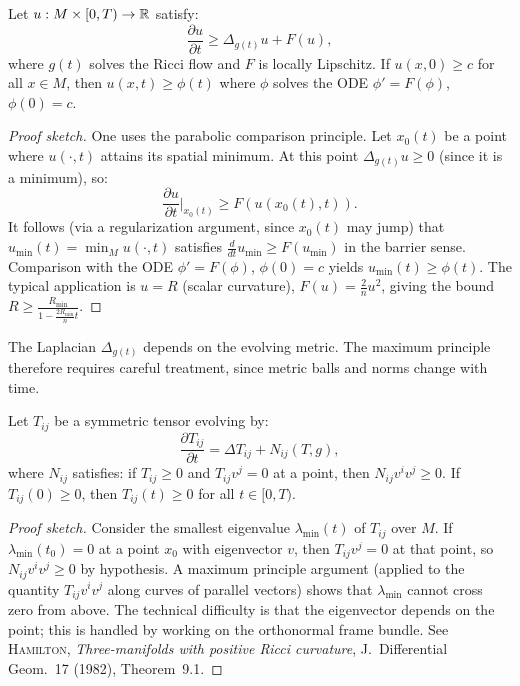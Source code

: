 \begin{theorem}
\label{thm:scalar_maximum}
Let $u : M \times [0, T) \to \mathbb{R}$ satisfy:
\[
    \frac{\partial u}{\partial t} \geq \Delta_{g(t)} u + F(u),
\]
where $g(t)$ solves the Ricci flow and $F$ is locally Lipschitz. If
$u(x, 0) \geq c$ for all $x \in M$, then $u(x, t) \geq \phi(t)$ where $\phi$
solves the ODE $\phi' = F(\phi)$, $\phi(0) = c$.
\end{theorem}

\begin{proof}[Proof sketch]
One uses the parabolic comparison principle. Let $x_0(t)$ be a point where
$u(\cdot, t)$ attains its spatial minimum. At this point $\Delta_{g(t)} u \geq 0$
(since it is a minimum), so:
\[
    \frac{\partial u}{\partial t}\bigg|_{x_0(t)} \geq F(u(x_0(t), t)).
\]
It follows (via a regularization argument, since $x_0(t)$ may jump) that
$u_{\min}(t) = \min_M u(\cdot, t)$ satisfies $\frac{d}{dt} u_{\min} \geq F(u_{\min})$
in the barrier sense. Comparison with the ODE $\phi' = F(\phi)$, $\phi(0) = c$
yields $u_{\min}(t) \geq \phi(t)$. The typical application is $u = R$ (scalar
curvature), $F(u) = \frac{2}{n}u^2$, giving the bound
$R \geq \frac{R_{\min}}{1 - \frac{2R_{\min}}{n}t}$.
\end{proof}

\begin{warning}[title=\textbf{The metric depends on time}]
The Laplacian $\Delta_{g(t)}$ depends on the evolving metric. The maximum principle
therefore requires careful treatment, since metric balls and norms change with time.
\end{warning}

\begin{theorem}
\label{thm:tensor_maximum}
Let $T_{ij}$ be a symmetric tensor evolving by:
\[
    \frac{\partial T_{ij}}{\partial t} = \Delta T_{ij} + N_{ij}(T, g),
\]
where $N_{ij}$ satisfies: if $T_{ij} \geq 0$ and $T_{ij}v^j = 0$ at a point,
then $N_{ij} v^i v^j \geq 0$. If $T_{ij}(0) \geq 0$, then $T_{ij}(t) \geq 0$
for all $t \in [0, T)$.
\end{theorem}

\begin{proof}[Proof sketch]
Consider the smallest eigenvalue $\lambda_{\min}(t)$ of $T_{ij}$ over $M$. If
$\lambda_{\min}(t_0) = 0$ at a point $x_0$ with eigenvector $v$, then
$T_{ij}v^j = 0$ at that point, so $N_{ij}v^i v^j \geq 0$ by hypothesis. A maximum
principle argument (applied to the quantity $T_{ij}v^i v^j$ along curves of parallel
vectors) shows that $\lambda_{\min}$ cannot cross zero from above. The technical
difficulty is that the eigenvector depends on the point; this is handled by working
on the orthonormal frame bundle.
See \textsc{Hamilton}, \emph{Three-manifolds with positive Ricci curvature},
J.~Differential Geom.~17 (1982), Theorem~9.1.
\end{proof}

